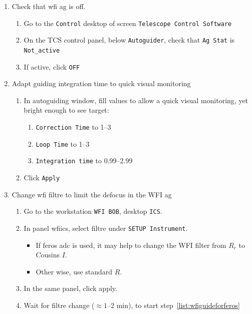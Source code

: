 \documentclass[11pt,fleqn,a4paper]{book}
\begin{document}
\label{proc:guideferoswfi}
\begin{enumerate}
    \item Check that \gls{wfi} \gls{ag} is off.
    \begin{enumerate}
        \item Go to the \texttt{Control} \gls{desktop} of screen \texttt{Telescope Control Software}
        \item On the \gls{TCS control panel}, below \texttt{Autoguider}, check that \texttt{Ag Stat} is \texttt{Not\_active}
        \item If active, click \texttt{OFF} 
    \end{enumerate}
    \item Adapt guiding integration time to quick visual monitoring
    \begin{enumerate}
        \item In \gls{autoguiding} window, fill values to allow a quick visual monitoring, yet bright enough to see target:
            \begin{enumerate}
                \item \texttt{Correction Time} to 1--3
                \item \texttt{Loop Time} to 1--3
                \item \texttt{Integration time} to 0.99--2.99
            \end{enumerate}
        \item Click \texttt{Apply}
    \end{enumerate}
    \item Change \gls{wfi} filtre to limit the defocus in the WFI \gls{ag}
    \begin{enumerate}
        \item Go to the workstation \texttt{WFI BOB}, \gls{desktop} \texttt{ICS}.
        \item In panel \gls{wfiics}, select filtre under \texttt{SETUP Instrument}.
        \begin{itemize}
            \item If \gls{feros} \gls{adc} is used, it may help to change the WFI filter from $R_c$ to Cousins $I$. 
            \item Other wise, use standard $R$.
        \end{itemize}
        \item In the same panel, click apply.
        \item Wait for filtre change ($\approx 1$--2 min), to start step~\ref{list:wfiguideforferos}

\end{enumerate}
\end{enumerate}
\end{document}

